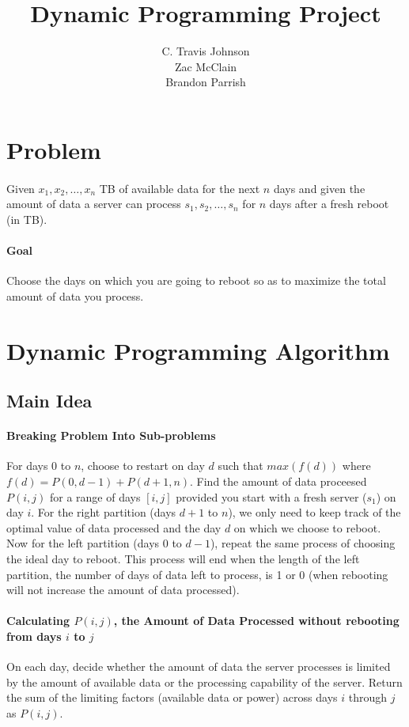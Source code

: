 \documentclass[12pt]{article}
\author{C. Travis Johnson \\ Zac McClain \\ Brandon Parrish}
\title{Dynamic Programming Project}
\begin{document}
\maketitle
\section{Problem}
\paragraph{}
Given $x_1, x_2, \dots, x_n$ TB of available data for the next $n$ days and given the amount of data a server can process $s_1, s_2, \dots, s_n$ for $n$ days after a fresh reboot (in TB).
\paragraph{Goal}
Choose the days on which you are going to reboot so as to maximize the total amount of data you process.
\section{Dynamic Programming Algorithm}
\subsection{Main Idea}
\paragraph{Breaking Problem Into Sub-problems}
For days $0$ to $n$, choose to restart on day $d$ such that $max(f(d))$ where $f(d) = P(0,d-1) + P(d+1,n)$.
Find the amount of data proceesed $P(i,j)$ for a range of days $[i, j]$ provided you start with a fresh server ($s_1$) on day $i$.
For the right partition (days $d+1$ to $n$), we only need to keep track of the optimal value of data processed and the day $d$ on which we choose to reboot.
Now for the left partition (days $0$ to $d-1$), repeat the same process of choosing the ideal day to reboot.
This process will end when the length of the left partition, the number of days of data left to process, is 1 or 0 (when rebooting will not increase the amount of data processed).
\paragraph{Calculating $P(i, j)$, the Amount of Data Processed without rebooting from days $i$ to $j$}
On each day, decide whether the amount of data the server processes is limited by the amount of available data or the processing capability of the server. Return the sum of the limiting factors (available data or power) across days $i$ through $j$ as $P(i, j)$.
\end{document}
